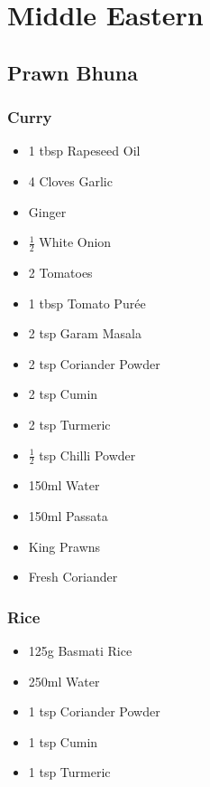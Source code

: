 \documentclass[11pt, english]{article}
\begin{document}
\newpage

\section{Middle Eastern}

	\subsection{Prawn Bhuna}

		\subsubsection*{Curry}

	\begin{itemize}
        \setlength\itemsep{0cm}
                \item 1 tbsp Rapeseed Oil
		\item 4 Cloves Garlic
		\item Ginger
		\item $\frac{1}{2}$ White Onion
		\item 2 Tomatoes
		\item 1 tbsp Tomato Pur\'{e}e
		\item 2 tsp Garam Masala
		\item 2 tsp Coriander Powder
		\item 2 tsp Cumin
		\item 2 tsp Turmeric
		\item $\frac{1}{2}$ tsp Chilli Powder
		\item 150ml Water
		\item 150ml Passata
		\item King Prawns
		\item Fresh Coriander
        \end{itemize}

		\subsubsection*{Rice}

	\begin{itemize}
	\setlength\itemsep{0cm}
		\item 125g Basmati Rice
		\item 250ml Water
		\item 1 tsp Coriander Powder
		\item 1 tsp Cumin
		\item 1 tsp Turmeric
	\end{itemize}
\end{document}
